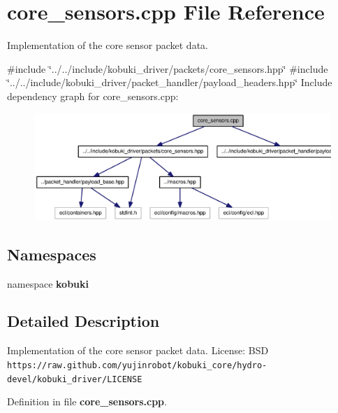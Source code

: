 \section{core\-\_\-sensors.\-cpp \-File \-Reference}
\label{core__sensors_8cpp}


\-Implementation of the core sensor packet data.  


{\ttfamily \#include \char`\"{}../../include/kobuki\-\_\-driver/packets/core\-\_\-sensors.\-hpp\char`\"{}}\*
{\ttfamily \#include \char`\"{}../../include/kobuki\-\_\-driver/packet\-\_\-handler/payload\-\_\-headers.\-hpp\char`\"{}}\*
\-Include dependency graph for core\-\_\-sensors.\-cpp\-:
\nopagebreak
\begin{figure}[H]
\begin{center}
\leavevmode
\includegraphics[width=350pt]{core__sensors_8cpp__incl}
\end{center}
\end{figure}
\subsection*{\-Namespaces}
\begin{DoxyCompactItemize}
\item 
namespace {\bf kobuki}
\end{DoxyCompactItemize}


\subsection{\-Detailed \-Description}
\-Implementation of the core sensor packet data. \-License\-: \-B\-S\-D {\tt https\-://raw.\-github.\-com/yujinrobot/kobuki\-\_\-core/hydro-\/devel/kobuki\-\_\-driver/\-L\-I\-C\-E\-N\-S\-E} 

\-Definition in file {\bf core\-\_\-sensors.\-cpp}.

